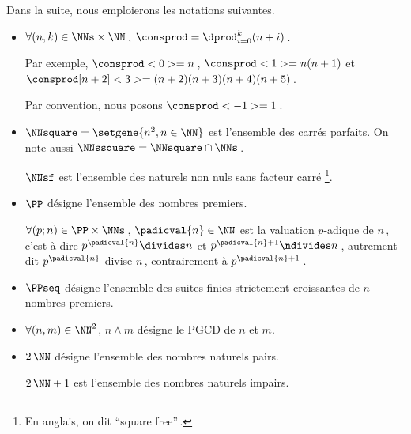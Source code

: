 Dans la suite, nous emploierons les notations suivantes.

\begin{itemize}
	\item $\forall (n, k) \in \NNs \times \NN$\,, $\consprod = \dprod_{i = 0}^{k} (n + i)$\,. 
	
	\noindent
	Par exemple,
	$\consprod<0> = n$\,,
	$\consprod<1> = n (n+1)$
	et
	$\consprod[n+2]<3> = (n+2) (n+3) (n+4) (n+5)$\,.
	
	\noindent
	Par convention, nous posons $\consprod<-1> = 1$\,.


	\medskip
	\item $\NNsquare = \setgene{n^2, n \in \NN}$ est l'ensemble des carrés parfaits.
	On note aussi $\NNssquare = \NNsquare \cap \NNs$\,.

	\noindent
	$\NNsf$ est l'ensemble des naturels non nuls sans facteur carré
	\footnote{
		En anglais, on dit \enquote{square free}\,.
	}.


	\medskip
	\item $\PP$ désigne l'ensemble des nombres premiers.
	
	\noindent
	$\forall (p ; n) \in \PP \times \NNs$\,, $\padicval{n} \in \NN$ est la valuation $p$-adique de $n$\,,
	c'est-à-dire 
	$p^{\padicval{n}} \divides n$ et $p^{\padicval{n} + 1} \ndivides n$\,,
	autrement dit
	$p^{\padicval{n}}$ divise $n$\,, contrairement à $p^{\padicval{n} + 1}$\,.


	\medskip
	\item $\PPseq$ désigne l'ensemble des suites finies strictement croissantes de $n$ nombres premiers.


	\medskip
	\item $\forall (n , m) \in \NN^2$, $n \wedge m$ désigne le PGCD de $n$ et $m$.

	
	\medskip
	\item $2\,\NN$ désigne l'ensemble des nombres naturels pairs.
	
	\noindent
	$2\,\NN + 1$ est l'ensemble des nombres naturels impairs.
\end{itemize}